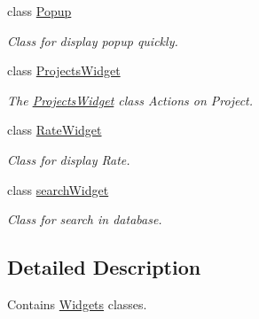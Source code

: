 \begin{DoxyCompactItemize}
class \hyperlink{classGui_1_1Widgets_1_1Popup}{Popup}
\begin{DoxyCompactList}\small\item\em Class for display popup quickly. \end{DoxyCompactList}\item 
class \hyperlink{classGui_1_1Widgets_1_1ProjectsWidget}{Projects\+Widget}
\begin{DoxyCompactList}\small\item\em The \hyperlink{classGui_1_1Widgets_1_1ProjectsWidget}{Projects\+Widget} class Actions on Project. \end{DoxyCompactList}\item 
class \hyperlink{classGui_1_1Widgets_1_1RateWidget}{Rate\+Widget}
\begin{DoxyCompactList}\small\item\em Class for display Rate. \end{DoxyCompactList}\item 
class \hyperlink{classGui_1_1Widgets_1_1searchWidget}{search\+Widget}
\begin{DoxyCompactList}\small\item\em Class for search in database. \end{DoxyCompactList}\end{DoxyCompactItemize}


\subsection{Detailed Description}
Contains \hyperlink{namespaceGui_1_1Widgets}{Widgets} classes. 